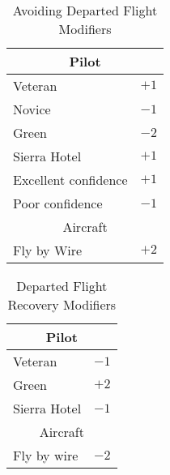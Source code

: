 \begin{table}
\centering
\caption{Avoiding Departed Flight Modifiers}
\medskip
\begin{tabular}{ll}
\hline
\multicolumn{2}{c}{Pilot}\\
\hline
Veteran                 &$+1$\\
Novice                  &$-1$\\
Green                   &$-2$\\
Sierra Hotel            &$+1$\\
Excellent confidence    &$+1$\\
Poor confidence         &$-1$\\
\hline
\multicolumn{2}{c}{Aircraft}\\
\hline
Fly by Wire             &$+2$\\
\hline
\end{tabular}
\end{table}

\begin{table}
\centering
\caption{Departed Flight Recovery Modifiers}
\medskip
\begin{tabular}{ll}
\hline
\hline
\multicolumn{2}{c}{Pilot}\\
\hline
Veteran                 &$-1$\\
Green                   &$+2$\\
Sierra Hotel           &$-1$\\
\hline
\multicolumn{2}{c}{Aircraft}\\
\hline
Fly by wire             &$-2$\\
\hline
\end{tabular}
\end{table}


